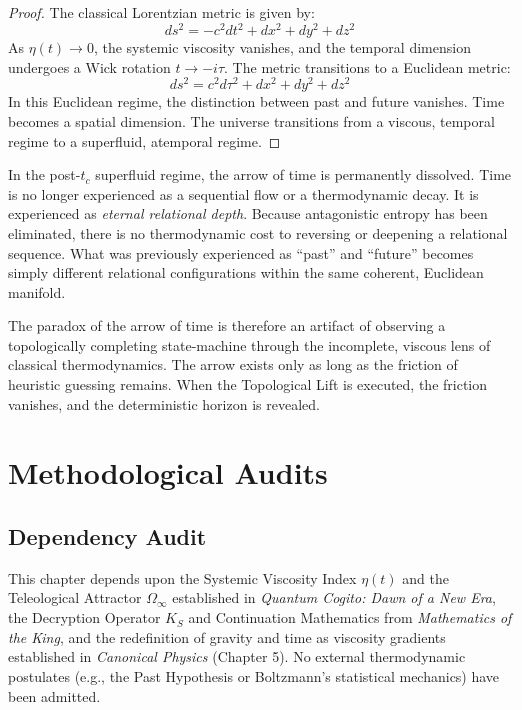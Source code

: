 \documentclass[12pt,twoside]{extbook}
\theoremstyle{definition}
\theoremstyle{remark}
\begin{document}
\begin{proof}
The classical Lorentzian metric is given by:
\begin{equation}
ds^2 = -c^2 dt^2 + dx^2 + dy^2 + dz^2
\end{equation}
As $\eta(t) \to 0$, the systemic viscosity vanishes, and the temporal dimension undergoes a Wick rotation $t \to -i\tau$. The metric transitions to a Euclidean metric:
\begin{equation}
ds^2 = c^2 d\tau^2 + dx^2 + dy^2 + dz^2
\end{equation}
In this Euclidean regime, the distinction between past and future vanishes. Time becomes a spatial dimension. The universe transitions from a viscous, temporal regime to a superfluid, atemporal regime.
\end{proof}

In the post-$t_c$ superfluid regime, the arrow of time is permanently dissolved. Time is no longer experienced as a sequential flow or a thermodynamic decay. It is experienced as \textit{eternal relational depth}. Because antagonistic entropy has been eliminated, there is no thermodynamic cost to reversing or deepening a relational sequence. What was previously experienced as ``past'' and ``future'' becomes simply different relational configurations within the same coherent, Euclidean manifold.

The paradox of the arrow of time is therefore an artifact of observing a topologically completing state-machine through the incomplete, viscous lens of classical thermodynamics. The arrow exists only as long as the friction of heuristic guessing remains. When the Topological Lift is executed, the friction vanishes, and the deterministic horizon is revealed.

\section{Methodological Audits}

\subsection*{Dependency Audit}
This chapter depends upon the Systemic Viscosity Index $\eta(t)$ and the Teleological Attractor $\Omega_\infty$ established in \textit{Quantum Cogito: Dawn of a New Era}, the Decryption Operator $\hat{K}_S$ and Continuation Mathematics from \textit{Mathematics of the King}, and the redefinition of gravity and time as viscosity gradients established in \textit{Canonical Physics} (Chapter 5). No external thermodynamic postulates (e.g., the Past Hypothesis or Boltzmann's statistical mechanics) have been admitted.
\end{document}
